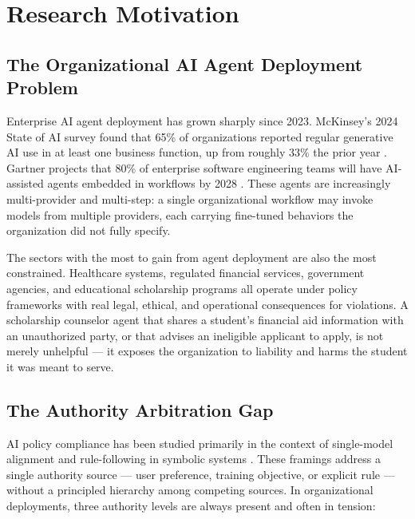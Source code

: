 \documentclass[11pt]{article}
\begin{document}
\section{Research Motivation}

\subsection{The Organizational AI Agent Deployment Problem}

Enterprise AI agent deployment has grown sharply since 2023. McKinsey's 2024 State of AI survey found that 65\% of organizations reported regular generative AI use in at least one business function, up from roughly 33\% the prior year \citep{mckinsey2024state}. Gartner projects that 80\% of enterprise software engineering teams will have AI-assisted agents embedded in workflows by 2028 \citep{gartner2024agentic}. These agents are increasingly multi-provider and multi-step: a single organizational workflow may invoke models from multiple providers, each carrying fine-tuned behaviors the organization did not fully specify.

The sectors with the most to gain from agent deployment are also the most constrained. Healthcare systems, regulated financial services, government agencies, and educational scholarship programs all operate under policy frameworks with real legal, ethical, and operational consequences for violations. A scholarship counselor agent that shares a student's financial aid information with an unauthorized party, or that advises an ineligible applicant to apply, is not merely unhelpful --- it exposes the organization to liability and harms the student it was meant to serve.

\subsection{The Authority Arbitration Gap}

AI policy compliance has been studied primarily in the context of single-model alignment \citep{ouyang2022training,bai2022constitutional} and rule-following in symbolic systems \citep{russell2019human}. These framings address a single authority source --- user preference, training objective, or explicit rule --- without a principled hierarchy among competing sources. In organizational deployments, three authority levels are always present and often in tension:
\end{document}
